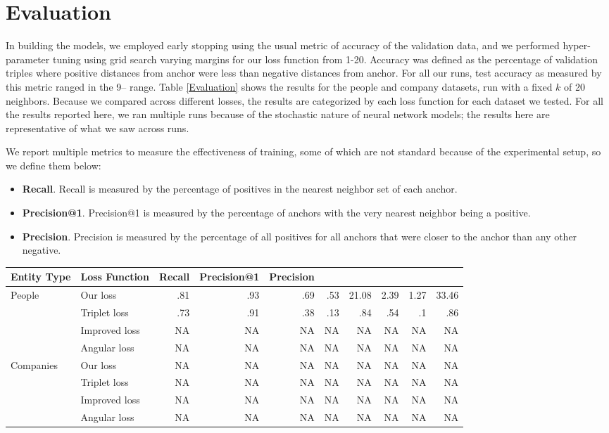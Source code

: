 \section{Evaluation}
\label{results}
In building the models, we employed early stopping using the usual metric of accuracy of the validation data, and we performed hyper-parameter tuning using grid search varying margins for our loss function from 1-20.  Accuracy was defined as the percentage of validation triples where positive distances from anchor were less than negative distances from anchor.  For all our runs, test accuracy as measured by this metric ranged in the 9-- range.  Table \ref{Evaluation} shows the results for the people and company datasets, run with a fixed $k$ of 20 neighbors.  Because we compared across different losses, the results are categorized by each loss function for each dataset we tested.  For all the results reported here, we ran multiple runs because of the stochastic nature of neural network models; the results here are representative of what we saw across runs. 

We report multiple metrics to measure the effectiveness of training, some of which are not standard because of the experimental setup, so we define them below:
\begin{itemize}
\item \textbf{Recall}.  Recall is measured by the percentage of positives in the nearest neighbor set of each anchor.
\item \textbf{Precision@1}.  Precision@1 is measured by the percentage of anchors with the very nearest neighbor being a positive.
\item \textbf{Precision}.  Precision is measured by the percentage of all positives for all anchors that were closer to the anchor than any other negative.
\end{itemize}
 
\begin{table*}[ht]
\caption{Results for people and companies by loss functions}
\label{Evaluation}
\begin{tabular}{l|l|r|r|r|r|r|r|r|r|}
\hline
Entity Type & Loss Function & Recall & Precision@1 & Precision \\
\hline
\multirow{4}{*}{People} & Our loss & .81 & .93 & .69 & .53 & 21.08 & 2.39 & 1.27 & 33.46 \\
\hline
& Triplet loss & .73 & .91 & .38 & .13 & .84 & .54 & .1 & .86 \\
\hline
& Improved loss & NA & NA & NA & NA & NA & NA & NA & NA \\
\hline
& Angular loss & NA & NA & NA & NA & NA & NA & NA & NA \\
\hline
\multirow{4}{*}{Companies} & Our loss & NA & NA & NA & NA & NA & NA & NA & NA \\
& Triplet loss & NA & NA & NA & NA & NA & NA & NA & NA \\
\hline
& Improved loss & NA & NA & NA & NA & NA & NA & NA & NA \\
\hline
& Angular loss & NA & NA & NA & NA & NA & NA & NA & NA \\
\hline
\end{tabular}
\end{table*}



